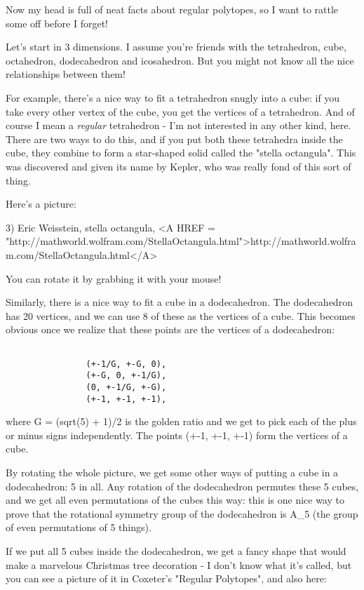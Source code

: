 Now my head is full of neat facts about regular polytopes, so I want
to rattle some off before I forget!   

Let's start in 3 dimensions.  I assume you're friends with the
tetrahedron, cube, octahedron, dodecahedron and icosahedron.  But you
might not know all the nice relationships between them!  

For example, there's a nice way to fit a tetrahedron snugly into a cube:
if you take every other vertex of the cube, you get the vertices of a
tetrahedron.  And of course I mean a \emph{regular} tetrahedron - I'm not
interested in any other kind, here.  There are two ways to do this, and
if you put both these tetrahedra inside the cube, they combine to form a
star-shaped solid called the "stella octangula".  This was
discovered and given its name by Kepler, who was really fond of this
sort of thing.

Here's a picture:

3) Eric Weisstein, stella octangula, 
<A HREF = "http://mathworld.wolfram.com/StellaOctangula.html">http://mathworld.wolfram.com/StellaOctangula.html</A>

You can rotate it by grabbing it with your mouse!

Similarly, there is a nice way to fit a cube in a dodecahedron.  The
dodecahedron has 20 vertices, and we can use 8 of these as the vertices
of a cube.  This becomes obvious once we realize that these points are
the vertices of a dodecahedron:


\begin{verbatim}

                (+-1/G, +-G, 0),
                (+-G, 0, +-1/G),
                (0, +-1/G, +-G),
                (+-1, +-1, +-1),
\end{verbatim}
    
where G = (sqrt(5) + 1)/2 is the golden ratio and we get to pick each of
the plus or minus signs independently.  The points (+-1, +-1, +-1) form
the vertices of a cube.  

By rotating the whole picture, we get some other ways of putting a cube
in a dodecahedron: 5 in all.  Any rotation of the dodecahedron permutes
these 5 cubes, and we get all even permutations of the cubes this way:
this is one nice way to prove that the rotational symmetry group of the
dodecahedron is A_{5} (the group of even permutations of 5 things).

If we put all 5 cubes inside the dodecahedron, we get a fancy shape
that would make a marvelous Christmas tree decoration - I don't know 
what it's called, but you can see a picture of it in Coxeter's "Regular
Polytopes", and also here:

